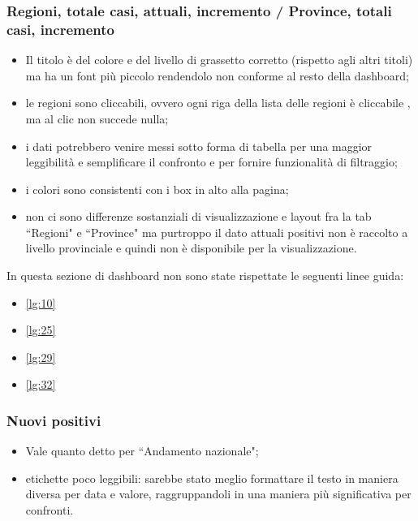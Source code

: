 \subsubsection{Regioni, totale casi, attuali, incremento / Province, totali casi, incremento}
\label{sss:regioni_province-totale_casi-attuali-incremento}
\begin{itemize}
    \item Il titolo è del colore e del livello di grassetto corretto (rispetto agli altri titoli) ma ha un font più piccolo rendendolo non conforme al resto della dashboard;
    \item le regioni sono cliccabili, ovvero ogni riga della lista delle regioni è cliccabile , ma al clic non succede nulla;
    \item i dati potrebbero venire messi sotto forma di tabella  per una maggior leggibilità e semplificare il confronto e per fornire funzionalità di filtraggio;
    \item i colori sono consistenti con i box in alto alla pagina;
    \item non ci sono differenze sostanziali di visualizzazione e layout fra la tab ``Regioni" e ``Province" ma purtroppo il dato attuali positivi non è raccolto a livello provinciale e quindi non è disponibile per la visualizzazione.
\end{itemize}
In questa sezione di dashboard non sono state rispettate le seguenti linee guida:
\begin{itemize}
    \item \ref{lg:10}
    \item \ref{lg:25}
    \item \ref{lg:29}
    \item \ref{lg:32}
\end{itemize}
\subsubsection{Nuovi positivi}
\label{sss:nuovi-positivi}
\begin{itemize}
    \item Vale quanto detto per ``Andamento nazionale";
    \item etichette poco leggibili: sarebbe stato meglio formattare il testo in maniera diversa per data e valore, raggruppandoli in una maniera più significativa per confronti.
\end{itemize}

